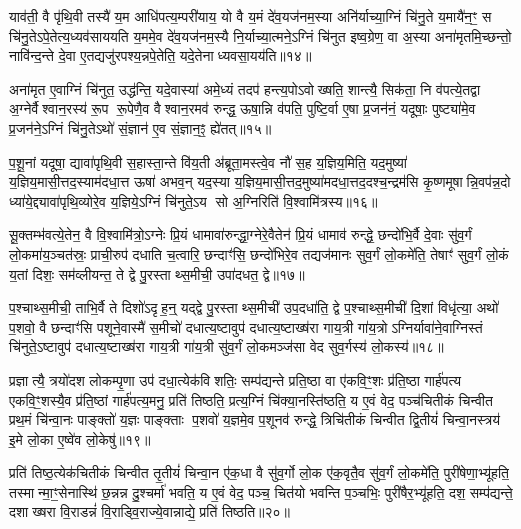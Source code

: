 {\anuvakamend[{वै विश्वे॑ दे॒वा ज्योति॑ष्मा॒नप॑चिततमौ त्रि॒वृद्वा आ॑दि॒त्या द्विच॑त्वारिशच्च॥२॥}]}

याव॑ती॒ वै पृ॑थि॒वी तस्यै॑ य॒म आधि॑पत्य॒म्परी॑याय॒ यो वै य॒मं दे॑व॒यज॑नम॒स्या अनि॑र्याच्या॒ग्निं चि॑नु॒ते य॒मायै॑न॒ꣳ॒ स चि॑नु॒तेऽपे॒तेत्य॒ध्यव॑साययति य॒ममे॒व दे॑व॒यज॑नम॒स्यै नि॒र्याच्या॒त्मने॒ऽग्निं चि॑नुत इष्व॒ग्रेण॒ वा अ॒स्या अना॑मृतमि॒च्छन्तो॒ नावि॑न्द॒न्ते दे॒वा ए॒तद्यजु॑रपश्य॒न्नपे॒तेति॒ यदे॒तेनाध्यवसा॒यय॑ति॥१४॥

अना॑मृत ए॒वाग्निं चि॑नुत॒ उद्ध॑न्ति॒ यदे॒वास्या॑ अमे॒ध्यं तदप॑ हन्त्य॒पोऽवोख्षति॒ शान्त्यै॒ सिक॑ता॒ नि व॑पत्ये॒तद्वा अ॒ग्नेर्वैश्वान॒रस्य॑ रू॒प रू॒पेणै॒व वैश्वान॒रमव॑ रुन्द्ध॒ ऊषा॒न्नि व॑पति॒ पुष्टि॒र्वा ए॒षा प्र॒जन॑नं॒ यदूषाः॒ पुष्ट्या॑मे॒व प्र॒जन॑ने॒ऽग्निं चि॑नु॒तेऽथो॑ सं॒ज्ञान॑ ए॒व सं॒ज्ञान॒ꣵ॒ ह्ये॑तत्॥१५॥

प॒शू॒नां यदूषा॒ द्यावा॑पृथि॒वी स॒हास्ता॒न्ते वि॑य॒ती अ॑ब्रूता॒मस्त्वे॒व नौ॑ स॒ह य॒ज्ञिय॒मिति॒ यद॒मुष्या॑ य॒ज्ञिय॒मासी॒त्तद॒स्याम॑दधा॒त्त ऊषा॑ अभव॒न् यद॒स्या य॒ज्ञिय॒मासी॒त्तद॒मुष्या॑मदधा॒त्तद॒दश्च॒न्द्रम॑सि कृ॒ष्णमूषान्नि॒वप॑न्न॒दो ध्या॑ये॒द्द्यावा॑पृथि॒व्योरे॒व य॒ज्ञिये॒ऽग्निं चि॑नुते॒ऽय सो अ॒ग्निरिति॑ वि॒श्वामि॑त्रस्य॥१६॥

सू॒क्तम्भ॑वत्ये॒तेन॒ वै वि॒श्वामि॑त्रो॒ऽग्नेः प्रि॒यं धामावा॑रुन्द्धा॒ग्नेरे॒वैतेन॑ प्रि॒यं धामाव॑ रुन्द्धे॒ छन्दो॑भि॒र्वै दे॒वाः सु॑व॒र्गं लो॒कमा॑य॒ञ्चत॑स्रः॒ प्राची॒रुप॑ दधाति च॒त्वारि॒ छन्दाꣳ॑सि॒ छन्दो॑भिरे॒व तद्यज॑मानः सुव॒र्गं लो॒कमे॑ति॒ तेषाꣳ॑ सुव॒र्गं लो॒कं य॒तां दिशः॒ सम॑व्लीयन्त॒ ते द्वे पु॒रस्ताथ्स॒मीची॒ उपा॑दधत॒ द्वे॥१७॥

प॒श्चाथ्स॒मीची॒ ताभि॒र्वै ते दिशो॑ऽदृह॒न्॒ यद्द्वे पु॒रस्ताथ्स॒मीची॑ उप॒दधा॑ति॒ द्वे प॒श्चाथ्स॒मीची॑ दि॒शां विधृ॑त्या॒ अथो॑ प॒शवो॒ वै छन्दाꣳ॑सि पशूने॒वास्मै॑ स॒मीचो॑ दधात्य॒ष्टावुप॑ दधात्य॒ष्टाख्ष॑रा गाय॒त्री गा॑य॒त्रोऽग्निर्यावा॑ने॒वाग्निस्तं चि॑नुते॒ऽष्टावुप॑ दधात्य॒ष्टाख्ष॑रा गाय॒त्री गा॑य॒त्री सु॑व॒र्गं लो॒कमञ्ज॑सा वेद सुव॒र्गस्य॑ लो॒कस्य॑॥१८॥

प्रज्ञात्यै॒ त्रयो॑दश लोकम्पृ॒णा उप॑ दधा॒त्येक॑विशतिः॒ सम्प॑द्यन्ते प्रति॒ष्ठा वा ए॑कवि॒ꣳ॒शः प्र॑ति॒ष्ठा गार्\mbox{}ह॑पत्य एकवि॒ꣳ॒शस्यै॒व प्र॑ति॒ष्ठां गार्\mbox{}ह॑पत्य॒मनु॒ प्रति॑ तिष्ठति॒ प्रत्य॒ग्निं चि॑क्या॒नस्ति॑ष्ठति॒ य ए॒वं वेद॒ पञ्च॑चितीकं चिन्वीत प्रथ॒मं चि॑न्वा॒नः पाङ्क्तो॑ य॒ज्ञः पाङ्क्ताः प॒शवो॑ य॒ज्ञमे॒व प॒शूनव॑ रुन्द्धे॒ त्रिचि॑तीकं चिन्वीत द्वि॒तीयं॑ चिन्वा॒नस्त्रय॑ इ॒मे लो॒का ए॒ष्वे॑व लो॒केषु॑॥१९॥

प्रति॑ तिष्ठ॒त्येक॑चितीकं चिन्वीत तृ॒तीयं॑ चिन्वा॒न ए॑क॒धा वै सु॑व॒र्गो लो॒क ए॑क॒वृतै॒व सु॑व॒र्गं लो॒कमे॑ति॒ पुरी॑षेणा॒भ्यू॑हति॒ तस्मान्मा॒ꣳ॒सेनास्थि॑ छ॒न्नन्न दु॒श्चर्मा॑ भवति॒ य ए॒वं वेद॒ पञ्च॒ चित॑यो भवन्ति प॒ञ्चभिः॒ पुरी॑षैर॒भ्यू॑हति॒ दश॒ सम्प॑द्यन्ते॒ दशाख्षरा वि॒राडन्नं॑ वि॒राड्वि॒राज्ये॒वान्नाद्ये॒ प्रति॑ तिष्ठति॥२०॥

